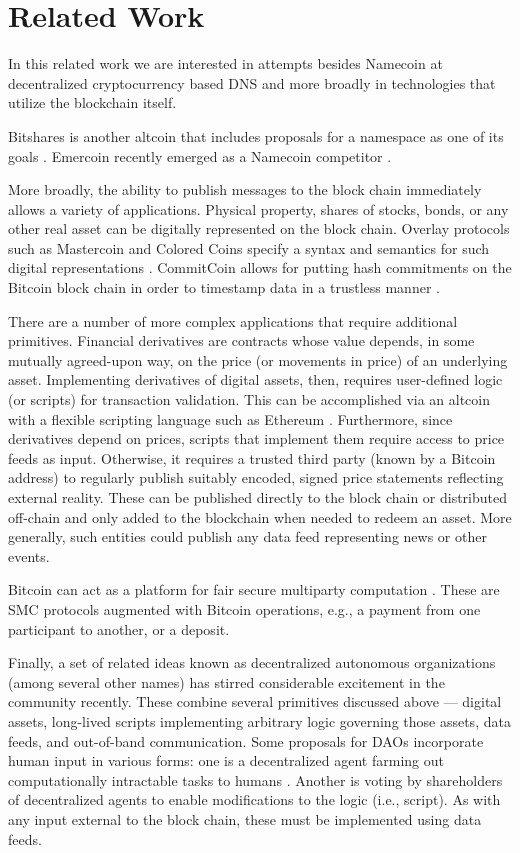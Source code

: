 \section{Related Work}
\label{sec:related}

In this related work we are interested in attempts besides Namecoin at decentralized cryptocurrency based DNS and more broadly in technologies that utilize the blockchain itself.

Bitshares is another altcoin that includes proposals for a namespace as one of its goals \cite{bitsharesdns}. Emercoin recently emerged as a Namecoin competitor \cite{emercoin}. 

More broadly, the ability to publish messages to the block chain immediately allows a variety of applications. Physical property, shares of stocks, bonds, or any other real asset can be digitally represented on the block chain. Overlay protocols such as Mastercoin and Colored Coins specify a syntax and semantics for such digital representations \cite{mastercoinspec, rosenfeld2012overview}. CommitCoin allows for putting hash commitments on the Bitcoin block chain in order to timestamp data in a trustless manner \cite{clark2012commitcoin}.

There are a number of more complex applications that require additional primitives. Financial derivatives are contracts whose value depends, in some mutually agreed-upon way, on the price (or movements in price) of an underlying asset. Implementing derivatives of digital assets, then, requires user-defined logic (or scripts) for transaction validation. This can be accomplished via an altcoin with a flexible scripting language such as Ethereum \cite{ethereumwhitepaper}. Furthermore, since derivatives depend on prices, scripts that implement them require access to price feeds as input. Otherwise, it requires a trusted third party (known by a Bitcoin address) to regularly publish suitably encoded, signed price statements reflecting external reality. These can be published directly to the block chain or distributed off-chain and only added to the blockchain when needed to redeem an asset. More generally, such entities could publish any data feed representing news or other events.

Bitcoin can act as a platform for fair secure multiparty computation \cite{andrychowicz2014secure, bentov2014use, kumaresan2014use}. These are SMC protocols augmented with Bitcoin operations, e.g., a payment from one participant to another, or a deposit.

Finally, a set of related ideas known as decentralized autonomous organizations (among several other names) has stirred considerable excitement in the community recently. These combine several primitives discussed above --- digital assets, long-lived scripts implementing arbitrary logic governing those assets, data feeds, and out-of-band communication. Some proposals for DAOs incorporate human input in various forms: one is a decentralized agent farming out computationally intractable tasks to humans \cite{buterindao}. Another is voting by shareholders of decentralized agents to enable modifications to the logic (i.e., script). As with any input external to the block chain, these must be implemented using data feeds.

